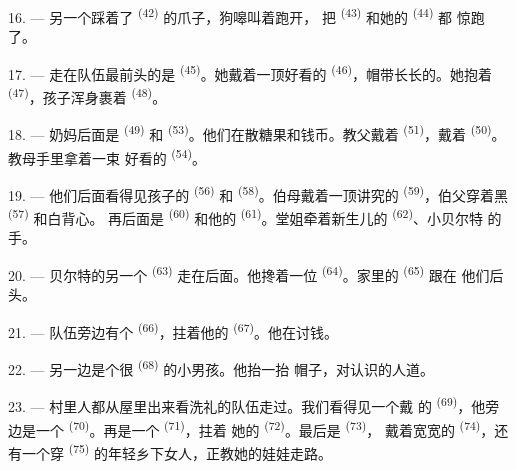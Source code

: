 16. --- 另一个踩着了 \textsuperscript{(42)} 的爪子，狗嗥叫着跑开，
把 \textsuperscript{(43)} 和她的 \textsuperscript{(44)} 都
惊跑了。

\VUsaut{5.0mm}
\VUsaut{4.0mm}

17. --- 走在队伍最前头的是 \textsuperscript{(45)}。她戴着一顶好看的
 \textsuperscript{(46)}，帽带长长的。她抱着
\textsuperscript{(47)}，孩子浑身裹着 \textsuperscript{(48)}。

18. --- 奶妈后面是 \textsuperscript{(49)} 和
\textsuperscript{(53)}。他们在散糖果和钱币。教父戴着
\textsuperscript{(51)}，戴着 \textsuperscript{(50)}。教母手里拿着一束
好看的 \textsuperscript{(54)}。

19. --- 他们后面看得见孩子的 \textsuperscript{(56)} 和
 \textsuperscript{(58)}。伯母戴着一顶讲究的
\textsuperscript{(59)}，伯父穿着黑 \textsuperscript{(57)} 和白背心。
再后面是 \textsuperscript{(60)} 和他的
\textsuperscript{(61)}。堂姐牵着新生儿的 \textsuperscript{(62)}、小贝尔特
的手。

20. --- 贝尔特的另一个 \textsuperscript{(63)} 走在后面。他搀着一位
 \textsuperscript{(64)}。家里的 \textsuperscript{(65)} 跟在
他们后头。

\VUsaut{4.6mm}
\VUsaut{3.4mm}

21. --- 队伍旁边有个 \textsuperscript{(66)}，拄着他的
\textsuperscript{(67)}。他在讨钱。

22. --- 另一边是个很 \textsuperscript{(68)} 的小男孩。他抬一抬
帽子，对认识的人道。

23. --- 村里人都从屋里出来看洗礼的队伍走过。我们看得见一个戴
的 \textsuperscript{(69)}，他旁边是一个
 \textsuperscript{(70)}。再是一个 \textsuperscript{(71)}，拄着
她的 \textsuperscript{(72)}。最后是 \textsuperscript{(73)}，
戴着宽宽的 \textsuperscript{(74)}，还有一个穿
\textsuperscript{(75)} 的年轻乡下女人，正教她的娃娃走路。

